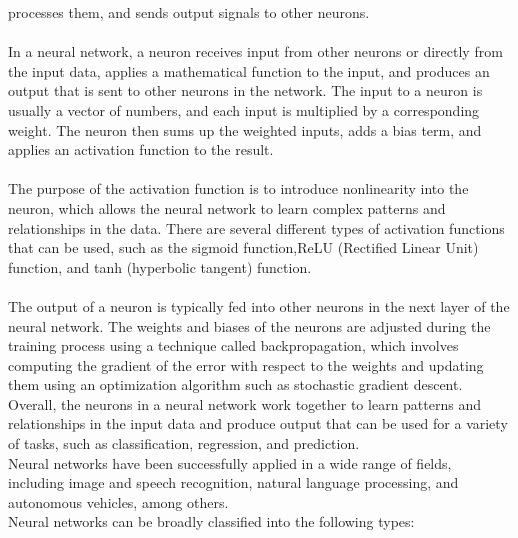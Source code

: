 processes them, and sends output signals to other neurons.\\
\\
In a neural network, a neuron receives input from other neurons or directly from the input data, applies a mathematical
function to the input, and produces an output that is sent to other neurons in the network. The input to a neuron is
usually a vector of numbers, and each input is multiplied by a corresponding weight. The neuron then sums up the
weighted inputs, adds a bias term, and applies an activation function to the result.\\
\\
The purpose of the activation function is to introduce nonlinearity into the neuron, which allows the neural network
to learn complex patterns and relationships in the data. There are several different types of activation functions
that can be used, such as the sigmoid function,ReLU (Rectified Linear Unit) function, and tanh (hyperbolic tangent)
function.\\
\\
The output of a neuron is typically fed into other neurons in the next layer of the neural network. The weights and
biases of the neurons are adjusted during the training process using a technique called backpropagation, which involves
computing the gradient of the error with respect to the weights and updating them using an optimization algorithm such
as stochastic gradient descent.\\
Overall, the neurons in a neural network work together to learn patterns and relationships in the input data and produce
output that can be used for a variety of tasks, such as classification, regression, and prediction.\\
Neural networks have been successfully applied in a wide range of fields, including image and speech recognition,
natural language processing, and autonomous vehicles, among others.\\
Neural networks can be broadly classified into the following types:
